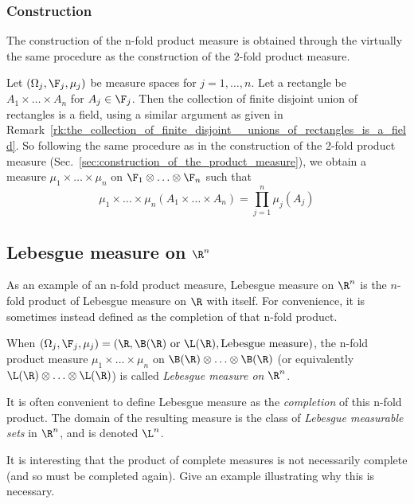 \documentclass{article} %
\begin{document}
\subsubsection{Construction}

The construction of the n-fold product measure \cite[pp.65]{folland1999real} is obtained through the virtually the same procedure as the construction of the 2-fold product measure.

Let $(\Omega_j, \F_j, \mu_j)$ be measure spaces for $j=1,\hdots,n$. Let a rectangle be $A_1 \times \hdots \times A_n$ for $A_j \in \F_j$. Then the collection of finite disjoint union of rectangles is a field, using a similar argument as given in Remark~\ref{rk:the_collection_of_finite_disjoint__unions_of_rectangles_is_a_field}.  So following the same procedure as in the construction of the 2-fold product measure (Sec.~\ref{sec:construction_of_the_product_measure}), we obtain a measure $\mu_1 \times \hdots \times \mu_n$ on $\F_1 \otimes \hdots \otimes \F_n$ such that
\[ \mu_1 \times \hdots \times \mu_n (A_1 \times \hdots \times A_n) = \prod_{j=1}^n \mu_j(A_j) \]  

\subsection{Lebesgue measure on $\R^n$}
As an example of an n-fold product measure, Lebesgue measure on $\R^n$ is the $n$-fold product of Lebesgue measure on $\R$ with itself. For convenience, it is sometimes instead defined as the completion of that n-fold product.  

\begin{example}{} When $(\Omega_j, \F_j, \mu_j) = (\R, \B(\R) \text{ or } \L(\R), \text{Lebesgue measure})$, the n-fold product measure  $\mu_1 \times \hdots \times \mu_n$ on $\B(\R) \otimes \hdots \otimes  \B(\R)$ (or equivalently $\L(\R) \otimes \hdots \otimes  \L(\R)$) is called \textit{Lebesgue measure on $\R^n$}.  
\end{example}

It is often convenient to define Lebesgue measure as the \textit{completion} of this n-fold product. The domain of the resulting measure is the class of \textit{Lebesgue measurable sets} in $\R^n$, and is denoted $\L^n$. 

\begin{question}
It is interesting that the product of complete measures is not necessarily complete (and so must be completed again).  Give an example illustrating why this is necessary. 	
\end{question}
\end{document}
